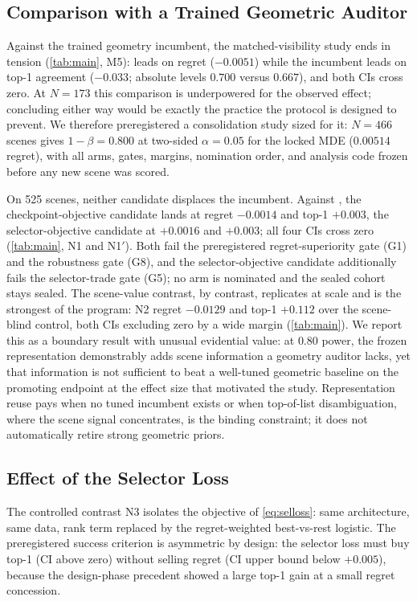 \subsection{Comparison with a Trained Geometric Auditor}
\label{sec:res-incumbent}

Against the trained geometry incumbent, the matched-visibility study ends in tension (\cref{tab:main}, M5): \headname{} leads on regret ($-0.0051$) while the incumbent leads on top-1 agreement ($-0.033$; absolute levels $0.700$ versus $0.667$), and both CIs cross zero.
At $N{=}173$ this comparison is underpowered for the observed effect; concluding either way would be exactly the practice the protocol is designed to prevent.
We therefore preregistered a consolidation study sized for it: $N=466$ scenes gives $1-\beta=0.800$ at two-sided $\alpha=0.05$ for the locked MDE ($0.00514$ regret), with all arms, gates, margins, nomination order, and analysis code frozen before any new scene was scored.

On 525 scenes, neither candidate displaces the incumbent.
Against \Lgeo, the checkpoint-objective candidate lands at regret $-0.0014$ and top-1 $+0.003$, the selector-objective candidate at $+0.0016$ and $+0.003$; all four CIs cross zero (\cref{tab:main}, N1 and N1$'$).
Both fail the preregistered regret-superiority gate (G1) and the robustness gate (G8), and the selector-objective candidate additionally fails the selector-trade gate (G5); no arm is nominated and the sealed cohort stays sealed.
The scene-value contrast, by contrast, replicates at scale and is the strongest of the program: N2 regret $-0.0129$ and top-1 $+0.112$ over the scene-blind control, both CIs excluding zero by a wide margin (\cref{tab:main}).
We report this as a boundary result with unusual evidential value: at $0.80$ power, the frozen representation demonstrably adds scene information a geometry auditor lacks, yet that information is not sufficient to beat a well-tuned geometric baseline on the promoting endpoint at the effect size that motivated the study.
Representation reuse pays when no tuned incumbent exists or when top-of-list disambiguation, where the scene signal concentrates, is the binding constraint; it does not automatically retire strong geometric priors.

\subsection{Effect of the Selector Loss}
\label{sec:res-selloss}

The controlled contrast N3 isolates the objective of \cref{eq:selloss}: same architecture, same data, rank term replaced by the regret-weighted best-vs-rest logistic.
The preregistered success criterion is asymmetric by design: the selector loss must buy top-1 (CI above zero) without selling regret (CI upper bound below $+0.005$), because the design-phase precedent showed a large top-1 gain at a small regret concession.

